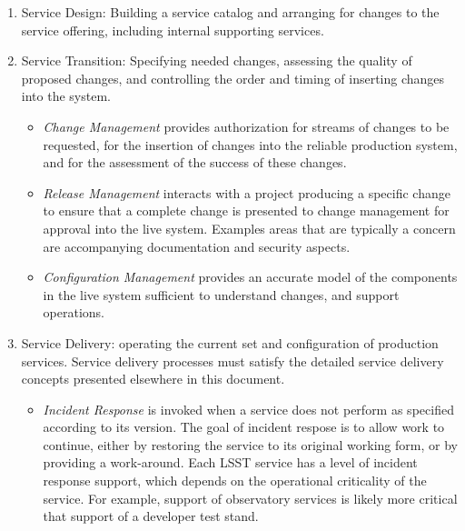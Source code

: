 \begin{enumerate}

\item Service Design: Building a service catalog and arranging for changes to the service offering, including internal supporting services.

\item Service Transition: Specifying needed changes, assessing the quality of proposed changes,
and controlling the order and timing of inserting changes into the system.

  \begin{itemize}

  \item \emph{Change Management} provides authorization for streams of changes to be requested, for the insertion of changes into the reliable production system, and for the assessment of the success of these changes.

  \item \emph{Release Management} interacts with a project producing a specific change to ensure that
a complete change is presented to change management for approval into the live system. Examples areas that are typically a concern are accompanying documentation and security aspects.

  \item \emph{Configuration Management} provides an accurate model of the components in the live system sufficient to understand changes, and support operations.

  \end{itemize}

\item Service Delivery: operating the current set and configuration of production services. Service delivery processes must satisfy the detailed service delivery concepts presented elsewhere in this document.

  \begin{itemize}

  \item \emph{Incident Response} is invoked when a service does not
  perform as specified according to its version.  The goal of
  incident respose is to allow work to continue, either by
  restoring the service to its original working form, or by providing
  a work-around.  Each LSST service has a level of incident
  response support, which depends on the operational criticality of the service.  For
  example, support of observatory services is likely more critical that support
  of a developer test stand.


\end{itemize}
\end{enumerate}
